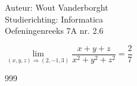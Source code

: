 \documentclass[a4paper]{article}
\newcommand{\Limit}{\lim\limits_}
\begin{document}
  
\noindent \large Auteur: Wout Vanderborght\\
\noindent \large Studierichting: Informatica\\
\noindent \large Oefeningenreeks 7A nr. 2.6\\

\medskip

\normalsize

$ \Limit{(x, y, z) \Rightarrow (2, -1, 3)} \dfrac{x+y+z}{x^2+y^2+z^2} = \dfrac{2}{7} $ \\

\begin{thebibliography}{999}
\end{thebibliography}
\end{document}
